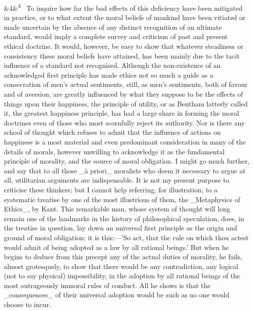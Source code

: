 \documentclass[12pt]{article}
\newcommand{\para}[1][]{\par\noindent\ifx&#1&\else\textsuperscript{\footnotesize #1}~\fi}
\begin{document}
\para[4] To inquire how far the bad effects of this deficiency have been mitigated in practice, or to what extent the moral beliefs of mankind have been vitiated or made uncertain by the absence of any distinct recognition of an ultimate standard, would imply a complete survey and criticism of past and present ethical doctrine. It would, however, be easy to show that whatever steadiness or consistency these moral beliefs have attained, has been mainly due to the tacit influence of a standard not recognised. Although the non-existence of an acknowledged first principle has made ethics not so much a guide as a consecration of men's actual sentiments, still, as men's sentiments, both of favour and of aversion, are greatly influenced by what they suppose to be the effects of things upon their happiness, the principle of utility, or as Bentham latterly called it, the greatest happiness principle, has had a large share in forming the moral doctrines even of those who most scornfully reject its authority. Nor is there any school of thought which refuses to admit that the influence of actions on happiness is a most material and even predominant consideration in many of the details of morals, however unwilling to acknowledge it as the fundamental principle of morality, and the source of moral obligation. I might go much further, and say that to all those \_à priori\_ moralists who deem it necessary to argue at all, utilitarian arguments are indispensable. It is not my present purpose to criticise these thinkers; but I cannot help referring, for illustration, to a systematic treatise by one of the most illustrious of them, the \_Metaphysics of Ethics\_, by Kant. This remarkable man, whose system of thought will long remain one of the landmarks in the history of philosophical speculation, does, in the treatise in question, lay down an universal first principle as the origin and ground of moral obligation; it is this:---'So act, that the rule on which thou actest would admit of being adopted as a law by all rational beings.' But when he begins to deduce from this precept any of the actual duties of morality, he fails, almost grotesquely, to show that there would be any contradiction, any logical (not to say physical) impossibility, in the adoption by all rational beings of the most outrageously immoral rules of conduct. All he shows is that the \_consequences\_ of their universal adoption would be such as no one would choose to incur.
\end{document}
